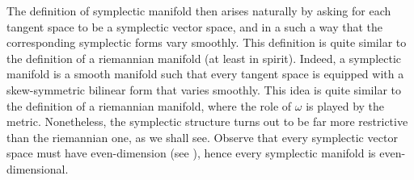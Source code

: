 
The definition of symplectic manifold then arises naturally by asking for each tangent space to be a symplectic vector space, and in a such a way that the corresponding symplectic forms vary smoothly.
This definition is quite similar to the definition of a riemannian manifold (at least in spirit). Indeed, a symplectic manifold is a smooth manifold such that every tangent space is equipped with a skew-symmetric bilinear form that varies smoothly. This idea is quite similar to the definition of a riemannian manifold, where the role of \(\omega\) is played by the metric. Nonetheless, the symplectic structure turns out to be far more restrictive than the riemannian one, as we shall see. Observe that every symplectic vector space must have even-dimension (see \parencite[Th. 1.1]{da2001lectures}), hence every symplectic manifold is even-dimensional.

